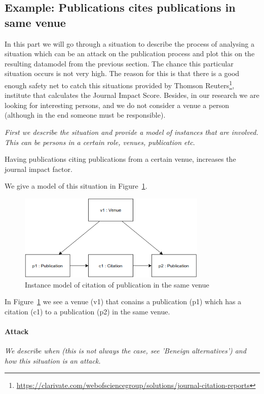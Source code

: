 \documentclass{ou-report}
\begin{document}
\subsection{Example: Publications cites publications in same venue}
\label{interesting_case:publications_cites_publications_in_same_venue}
In this part we will go through a situation to describe the process of analysing
a situation which can be an attack on the publication process and plot this on the
resulting datamodel from the previous section. The chance this 
particular situation occurs is not very high. The reason for this is that there is a good
enough safety net to catch this situations provided by Thomson Reuters\footnote{\url{https://clarivate.com/webofsciencegroup/solutions/journal-citation-reports}}, 
institute that 
calculates the Journal Impact Score. Besides, in our research we are looking for
interesting persons, and we do not consider a venue a person (although in the
end someone must be responsible).

\textit{First we describe the situation and provide a model of instances that 
are involved. This can be persons in a certain role, venues, publication etc}.

Having publications citing publications from a certain venue, increases the 
journal impact factor.

We give a model of this situation in Figure~\ref{fig:cpsv}.

\begin{figure}[H]
\centering
\includegraphics[width=9cm]{images/cited_publications_same_journal.drawio.png}
\caption{Instance model of citation of publication in the same venue}
\label{fig:cpsv}
\end{figure}

In Figure~\ref{fig:cpsv} we see a venue (v1) that conains a publication (p1)
which has a citation (c1) to a publication (p2) in the same venue.
\paragraph{Attack}
\textit{We describe when (this is not always the case, see 'Beneign 
alternatives') and how this situation is an attack.} 
\end{document}
